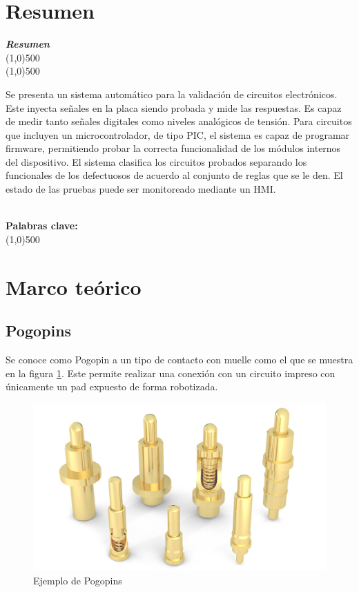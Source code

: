 \documentclass[12pt,letterpaper]{article}     %
\makeatletter
\newcounter{resumen}
\newenvironment{resumen}
{	
	\begin{center}
	\begin{minipage}[t]{500 pt}
	\vspace{5mm}
	\emph{\textbf{Resumen}}
	\\[-2mm]
	\line(1,0){500}
	\\[-4.25 mm]
	\line(1,0){500}
	\vspace{\baselineskip}
}
{
	\normalsize
	\\[2mm]
	\footnotesize\textbf{Palabras clave: \footnotesize\@palabras}
	\\[-2mm]
	\line(1,0){500}
	\\[0.5cm]
	\end{minipage}
	\end{center}
}
\makeatother
\begin{document}
\newpage
\section{Resumen}
\begin{resumen}
	Se presenta un sistema automático para la validación de circuitos electrónicos.
	Este inyecta señales en la placa siendo probada y mide las respuestas.
	Es capaz de medir tanto señales digitales como niveles analógicos de tensión.
	Para circuitos que incluyen un microcontrolador, de tipo PIC, el sistema es capaz de programar
	firmware, permitiendo probar la correcta funcionalidad de los módulos internos
	del dispositivo. El sistema clasifica los circuitos probados separando los
	funcionales de los defectuosos de acuerdo al conjunto de reglas que se le den.
	El estado de las pruebas puede ser monitoreado mediante un HMI.
\end{resumen} 
% 
\section{Marco teórico}
\label{Marco teórico}

\subsection{Pogopins}

Se conoce como Pogopin a un tipo de contacto con muelle como el que se muestra en la figura \ref{fig:pogopin}.
Este permite realizar una conexión con un circuito impreso con únicamente un pad expuesto de forma robotizada.

\begin{figure}[!ht]
\centering
\includegraphics[]{imagenes/pogopin.jpg}
\caption{Ejemplo de Pogopins}
\label{fig:pogopin}
\end{figure}
\end{document}
